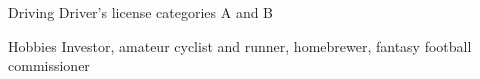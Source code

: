 

\begin{cvskills}

  
  
  \cvskill
    {Driving} %
    {Driver's license categories A and B} %
    
  \cvskill
    {Hobbies} %
    {Investor, amateur cyclist and runner, homebrewer, fantasy football commissioner} %

\end{cvskills}